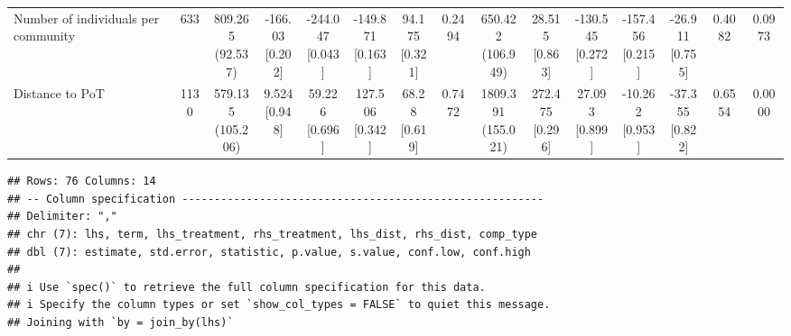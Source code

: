 \documentclass[
]{article}
\begin{document}
\begin{table}
{\begin{tabular}[t]{lcccccccccccccc}
\hspace{1em}Number of individuals per community & 633 & \makecell[c]{809.265\\(92.537)} & \makecell[c]{-166.03\\{[0.202]}} & \makecell[c]{-244.047\\{[0.043]}} & \makecell[c]{-149.871\\{[0.163]}} & \makecell[c]{94.175\\{[0.321]}} & 0.2494 & \makecell[c]{650.422\\(106.949)} & \makecell[c]{28.515\\{[0.863]}} & \makecell[c]{-130.545\\{[0.272]}} & \makecell[c]{-157.456\\{[0.215]}} & \makecell[c]{-26.911\\{[0.755]}} & 0.4082 & 0.0973\\
\hspace{1em}Distance to PoT & 1130 & \makecell[c]{579.135\\(105.206)} & \makecell[c]{9.524\\{[0.948]}} & \makecell[c]{59.226\\{[0.696]}} & \makecell[c]{127.506\\{[0.342]}} & \makecell[c]{68.28\\{[0.619]}} & 0.7472 & \makecell[c]{1809.391\\(155.021)} & \makecell[c]{272.475\\{[0.296]}} & \makecell[c]{27.093\\{[0.899]}} & \makecell[c]{-10.262\\{[0.953]}} & \makecell[c]{-37.355\\{[0.822]}} & 0.6554 & 0.0000\\
\bottomrule
\end{tabular}}
\end{table}

\begin{verbatim}
## Rows: 76 Columns: 14
## -- Column specification --------------------------------------------------------
## Delimiter: ","
## chr (7): lhs, term, lhs_treatment, rhs_treatment, lhs_dist, rhs_dist, comp_type
## dbl (7): estimate, std.error, statistic, p.value, s.value, conf.low, conf.high
## 
## i Use `spec()` to retrieve the full column specification for this data.
## i Specify the column types or set `show_col_types = FALSE` to quiet this message.
## Joining with `by = join_by(lhs)`
\end{verbatim}
\end{document}

